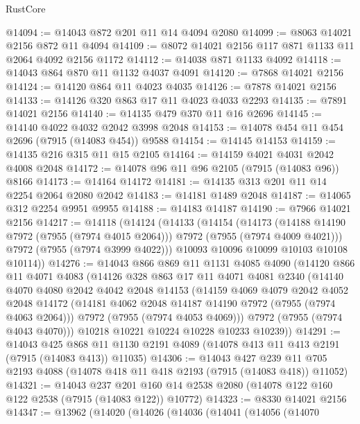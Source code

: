 \begin{lexlean}{RustCore}
\begin{coremodule}
@14094 := @14043 @872 @201 @11 @14 @4094 @2080
@14099 := @8063 @14021 @2156 @872 @11 @4094
@14109 := @8072 @14021 @2156 @117 @871 @1133 @11 @2064 @4092 @2156 @1172
@14112 := @14038 @871 @1133 @4092
@14118 := @14043 @864 @870 @11 @1132 @4037 @4091
@14120 := @7868 @14021 @2156
@14124 := @14120 @864 @11 @4023 @4035
@14126 := @7878 @14021 @2156
@14133 := @14126 @320 @863 @17 @11 @4023 @4033 @2293
@14135 := @7891 @14021 @2156
@14140 := @14135 @479 @370 @11 @16 @2696
@14145 := @14140 @4022 @4032 @2042 @3998 @2048
@14153 := @14078 @454 @11 @454 @2696 (@7915 (@14083 @454)) @9588
@14154 := @14145 @14153
@14159 := @14135 @216 @315 @11 @15 @2105
@14164 := @14159 @4021 @4031 @2042 @4008 @2048
@14172 := @14078 @96 @11 @96 @2105 (@7915 (@14083 @96)) @8166
@14173 := @14164 @14172
@14181 := @14135 @313 @201 @11 @14 @2254 @2064 @2080 @2042
@14183 := @14181 @1489 @2048
@14187 := @14065 @312 @2254 @9951 @9955
@14188 := @14183 @14187
@14190 := @7966 @14021 @2156
@14217 := @14118
    (@14124
      (@14133
        (@14154
          (@14173
            (@14188 @14190 @7972 (@7955 (@7974 @4015 @2064)))
            @7972
            (@7955 (@7974 @4009 @4021)))
          @7972
          (@7955 (@7974 @3999 @4022)))
        @10093
        @10096
        @10099
        @10103
        @10108
        @10114))
@14276 := @14043
    @866
    @869
    @11
    @1131
    @4085
    @4090
    (@14120
      @866
      @11
      @4071
      @4083
      (@14126
        @328
        @863
        @17
        @11
        @4071
        @4081
        @2340
        (@14140
          @4070
          @4080
          @2042
          @4042
          @2048
          @14153
          (@14159
            @4069
            @4079
            @2042
            @4052
            @2048
            @14172
            (@14181 @4062 @2048 @14187 @14190 @7972 (@7955 (@7974 @4063 @2064)))
            @7972
            (@7955 (@7974 @4053 @4069)))
          @7972
          (@7955 (@7974 @4043 @4070)))
        @10218
        @10221
        @10224
        @10228
        @10233
        @10239))
@14291 := @14043
    @425
    @868
    @11
    @1130
    @2191
    @4089
    (@14078 @413 @11 @413 @2191 (@7915 (@14083 @413)) @11035)
@14306 := @14043
    @427
    @239
    @11
    @705
    @2193
    @4088
    (@14078 @418 @11 @418 @2193 (@7915 (@14083 @418)) @11052)
@14321 := @14043
    @237
    @201
    @160
    @14
    @2538
    @2080
    (@14078 @122 @160 @122 @2538 (@7915 (@14083 @122)) @10772)
@14323 := @8330 @14021 @2156
@14347 := @13962
    (@14020
      (@14026
        (@14036
          (@14041
            (@14056
              (@14070

\end{coremodule}
\end{lexlean}
